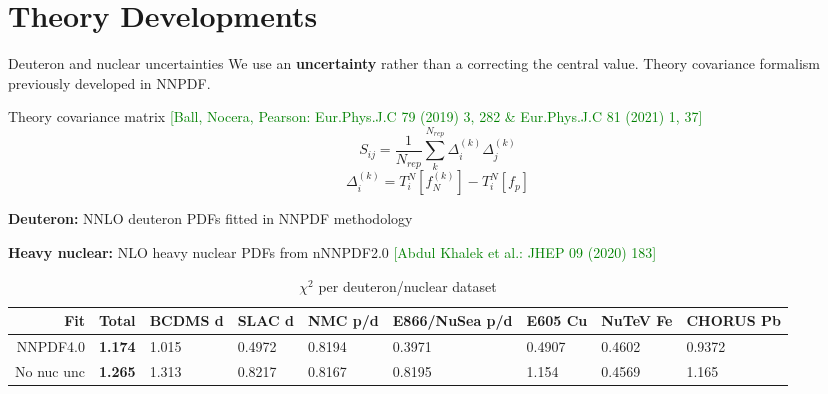 \documentclass{beamer}
\author[NNPDF]{
Christopher Schwan and
Rosalyn Pearson and
Felix Hekhorn and
Tommaso Giani and
Juan Cruz-Martinez and
Roy Stegeman and
Michael Wilson and
Zahari Kassabov and
Tanjona Rabemananjara
}
\begin{document}
\section{Theory Developments}
\begin{frame}[fragile]{Deuteron and nuclear uncertainties}
We use an {\bf uncertainty} rather than a correcting the central value.
\newline
Theory covariance formalism previously developed in NNPDF.
      \begin{block}{Theory covariance matrix \tiny{ \textcolor{green}{[Ball, Nocera, Pearson: Eur.Phys.J.C 79 (2019) 3, 282 \& Eur.Phys.J.C 81 (2021) 1, 37]}}}
        \begin{equation}
            S_{ij} = \frac{1}{N_{rep}} \sum_k^{N_{rep}} \Delta_i^{(k)}\Delta_j^{(k)}
        \end{equation}
        \begin{equation}
            \Delta_i^{(k)} = T_i^{N}[f_{N}^{(k)}] - T_i^{N}[f_{p}]
        \end{equation}
      \end{block}
      
    \textbf{Deuteron:} NNLO deuteron PDFs fitted in NNPDF methodology 
    
    \textbf{Heavy nuclear:} NLO heavy nuclear PDFs from nNNPDF2.0 \tiny{ \textcolor{green}{[Abdul Khalek et al.: JHEP 09 (2020) 183]}}
  \begin{table}
    \caption{$\chi^2$ per deuteron/nuclear dataset}
    \begin{tabular}{rllllllll}
      \toprule
      Fit & {\bf Total} & BCDMS d & SLAC d & NMC p/d & E866/NuSea p/d & E605 Cu & NuTeV Fe & CHORUS Pb \\
      \midrule
      NNPDF4.0 & {\bf 1.174} & 1.015 & 0.4972 & 0.8194 & 0.3971 & 0.4907 & 0.4602 & 0.9372 \\
      No nuc unc & {\bf 1.265} & 1.313 & 0.8217 & 0.8167 & 0.8195 & 1.154 & 0.4569 & 1.165 \\
      \bottomrule
    \end{tabular}
  \end{table}
\end{frame}
\end{document}

